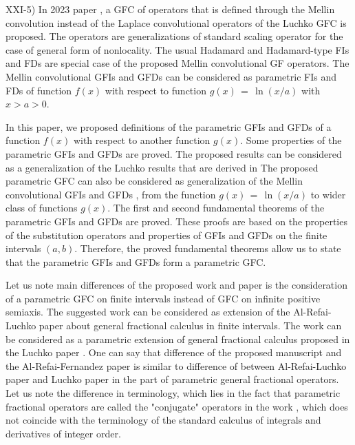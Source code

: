 \documentclass[12pt]{article}
\begin{document}

XXI-5) In 2023 paper \cite{FF-2023}, a GFC of operators that is defined through the Mellin convolution instead of the Laplace convolutional operators of the Luchko GFC is proposed. 
The operators are generalizations of standard scaling operator for the case of general form of nonlocality. 
The usual Hadamard and Hadamard-type FIs and FDs are special case of the proposed Mellin convolutional GF operators. 
The Mellin convolutional GFIs and GFDs can be considered as parametric FIs and FDs of function $f(x)$ with respect to function $g(x) \, = \, \ln(x/a)$ with $x>a>0$.

In this paper, we proposed definitions of the parametric GFIs and GFDs of a function $f(x)$ with respect to another function $g(x)$. 
Some properties of the parametric GFIs and GFDs are proved.
The proposed results can be considered as a generalization of the Luchko results that are derived in \cite{Luchko2023}
The proposed parametric GFC can also be considered as generalization of the Mellin convolutional GFIs and GFDs 
\cite{FF-2023}, from the function $g(x) \, = \, \ln(x/a)$ to wider class of functions $g(x)$.
The first and second fundamental theorems of the parametric GFIs and GFDs are proved.
These proofs are based on the properties of the substitution operators and properties of GFIs and GFDs on the finite intervals $(a,b)$.
Therefore, the proved fundamental theorems allow us to state that the parametric GFIs and GFDs form a parametric GFC.

Let us note main differences of the proposed work and paper \cite{Fernandez-2023} is the consideration of a parametric GFC on finite intervals instead of GFC on infinite positive semiaxis. 
The suggested work can be considered as extension of the Al-Refai-Luchko paper \cite{Luchko2023}about general fractional calculus in finite intervals. 
The work \cite{Fernandez-2023} can be considered as a parametric extension of general fractional calculus proposed in the Luchko paper \cite{Luchko2021-1}. 
One can say that difference of the proposed manuscript and the Al-Refai-Fernandez paper \cite{Fernandez-2023} is similar to difference of between Al-Refai-Luchko paper \cite{Luchko2023} and Luchko paper \cite{Luchko2021-1} in the part of parametric general fractional operators.
Let us note the difference in terminology, which lies in the fact that parametric fractional operators are called the "conjugate" operators in the work \cite{Fernandez-2023}, which does not coincide with the terminology of the standard calculus of integrals and derivatives of integer order.
\end{document}

